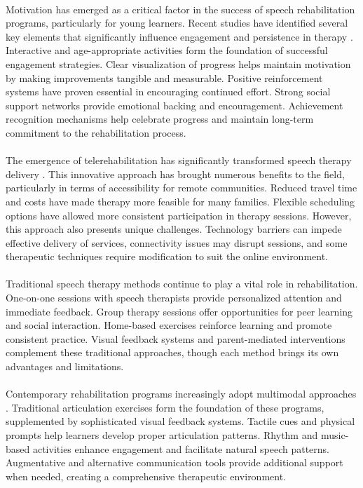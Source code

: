 \paragraph{}
Motivation has emerged as a critical factor in the success of speech rehabilitation programs, particularly for young learners. Recent studies have identified several key elements that significantly influence engagement and persistence in therapy \cite{motivation_speech2023}. Interactive and age-appropriate activities form the foundation of successful engagement strategies. Clear visualization of progress helps maintain motivation by making improvements tangible and measurable. Positive reinforcement systems have proven essential in encouraging continued effort. Strong social support networks provide emotional backing and encouragement. Achievement recognition mechanisms help celebrate progress and maintain long-term commitment to the rehabilitation process.

\paragraph{}
The emergence of telerehabilitation has significantly transformed speech therapy delivery \cite{telerehab2022}. This innovative approach has brought numerous benefits to the field, particularly in terms of accessibility for remote communities. Reduced travel time and costs have made therapy more feasible for many families. Flexible scheduling options have allowed more consistent participation in therapy sessions. However, this approach also presents unique challenges. Technology barriers can impede effective delivery of services, connectivity issues may disrupt sessions, and some therapeutic techniques require modification to suit the online environment.

\paragraph{}
Traditional speech therapy methods continue to play a vital role in rehabilitation. One-on-one sessions with speech therapists provide personalized attention and immediate feedback. Group therapy sessions offer opportunities for peer learning and social interaction. Home-based exercises reinforce learning and promote consistent practice. Visual feedback systems and parent-mediated interventions complement these traditional approaches, though each method brings its own advantages and limitations.

\paragraph{}
Contemporary rehabilitation programs increasingly adopt multimodal approaches \cite{multimodal2023}. Traditional articulation exercises form the foundation of these programs, supplemented by sophisticated visual feedback systems. Tactile cues and physical prompts help learners develop proper articulation patterns. Rhythm and music-based activities enhance engagement and facilitate natural speech patterns. Augmentative and alternative communication tools provide additional support when needed, creating a comprehensive therapeutic environment.

